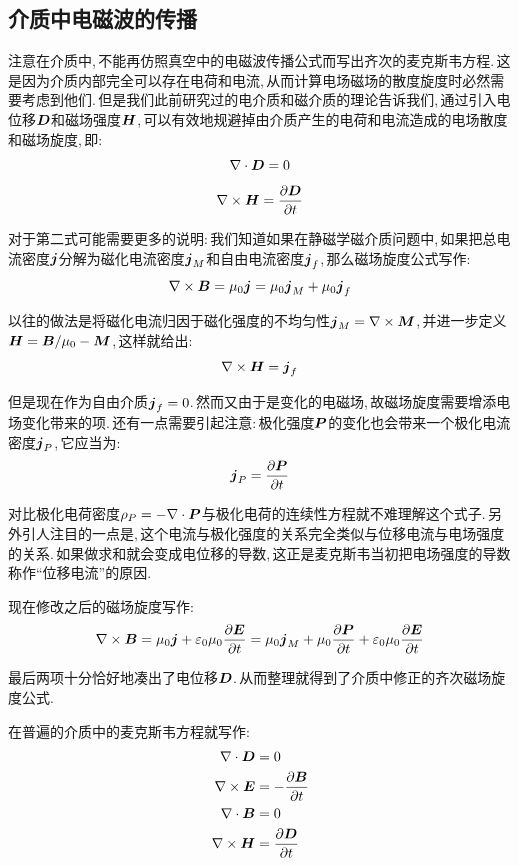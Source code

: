 \subsection{介质中电磁波的传播}

注意在介质中,\,不能再仿照真空中的电磁波传播公式而写出齐次的麦克斯韦方程.\,这是因为介质内部完全可以存在电荷和电流,\,从而计算电场磁场的散度旋度时必然需要考虑到他们.\,但是我们此前研究过的电介质和磁介质的理论告诉我们,\,通过引入电位移$\boldsymbol{D}$和磁场强度$\boldsymbol{H}$,\,可以有效地规避掉由介质产生的电荷和电流造成的电场散度和磁场旋度,\,即:
\[\nabla\cdot \boldsymbol{D}=0\]
\[\nabla\times \boldsymbol{H}=\frac{\partial \boldsymbol{D}}{\partial t}\]

对于第二式可能需要更多的说明:\,我们知道如果在静磁学磁介质问题中,\,如果把总电流密度$\boldsymbol{j}$分解为磁化电流密度$\boldsymbol{j}_M$和自由电流密度$\boldsymbol{j}_f$,\,那么磁场旋度公式写作:
\[\nabla\times \boldsymbol{B}=\mu_0\boldsymbol{j}=\mu_0\boldsymbol{j}_M+\mu_0 \boldsymbol{j}_f\]

以往的做法是将磁化电流归因于磁化强度的不均匀性$\boldsymbol{j}_M=\nabla\times \boldsymbol{M}$,\,并进一步定义$\boldsymbol{H}=\boldsymbol{B}/\mu_0-\boldsymbol{M}$,\,这样就给出:
\[\nabla\times\boldsymbol{H}=\boldsymbol{j}_f\]

但是现在作为自由介质$\boldsymbol{j}_f=0$.\,然而又由于是变化的电磁场,\,故磁场旋度需要增添电场变化带来的项.\,还有一点需要引起注意:\,极化强度$\boldsymbol{P}$的变化也会带来一个极化电流密度$\boldsymbol{j}_P$,\,它应当为:
\[\boldsymbol{j}_P=\frac{\partial \boldsymbol{P}}{\partial t}\]

对比极化电荷密度$\rho_P=-\nabla\cdot \boldsymbol{P}$与极化电荷的连续性方程就不难理解这个式子.\,另外引人注目的一点是,\,这个电流与极化强度的关系完全类似与位移电流与电场强度的关系.\,如果做求和就会变成电位移的导数,\,这正是麦克斯韦当初把电场强度的导数称作``位移电流''的原因.

现在修改之后的磁场旋度写作:
\[\nabla\times \boldsymbol{B}=\mu_0\boldsymbol{j}+\varepsilon_0\mu_0\frac{\partial \boldsymbol{E}}{\partial t}=\mu_0\boldsymbol{j}_M+\mu_0\frac{\partial \boldsymbol{P}}{\partial t}+\varepsilon_0\mu_0\frac{\partial \boldsymbol{E}}{\partial t}\]

最后两项十分恰好地凑出了电位移$\boldsymbol{D}$.\,从而整理就得到了介质中修正的齐次磁场旋度公式.

在普遍的介质中的麦克斯韦方程就写作:
\begin{align*}
\nabla\cdot \boldsymbol{D} &=  0\\
\nabla\times \boldsymbol{E} &=   -\frac{\partial \boldsymbol{B}}{\partial t} \\
\nabla\cdot \boldsymbol{B} &=  0 \\
\nabla\times\boldsymbol{H} &= \frac{\partial \boldsymbol{D}}{\partial t}
\end{align*}

